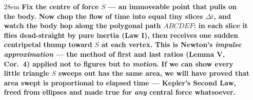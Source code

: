 \documentclass[border=4pt]{standalone}
\begin{document}
\begin{varwidth}{28em}
\large\bfseries
Fix the centre of force $S$ — an immoveable point that pulls on the body.      Now chop the flow of time into equal tiny slices $\Delta t$, and watch the body hop along the      polygonal path $ABCDEF$: in each slice it flies dead-straight by pure inertia (\textbf{Law I}),      then receives one sudden centripetal thump toward $S$ at each vertex. This is Newton's \textit{impulse      approximation} — the method of first and last ratios (\textbf{Lemma V, Cor.~4}) applied not to figures but to      \emph{motion}. If we can show every little triangle $S$ sweeps out has the same area, we will have proved      that area swept is proportional to elapsed time — Kepler's Second Law, freed from ellipses and made true for      \emph{any} central force whatsoever.
\end{varwidth}
\end{document}
